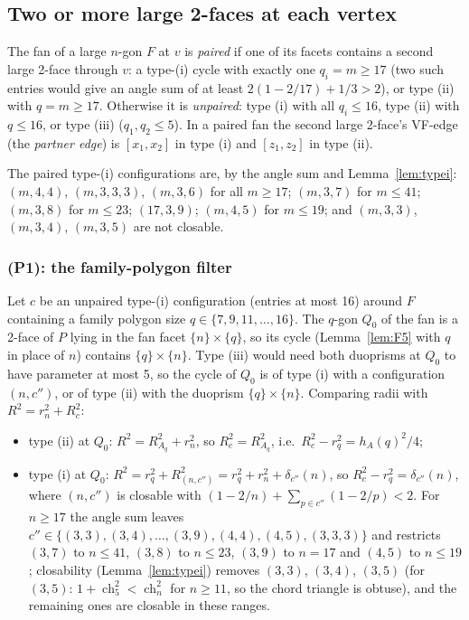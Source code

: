 \documentclass[11pt]{article}
\theoremstyle{definition}
\theoremstyle{remark}
\newcommand{\ch}{\operatorname{ch}}
\begin{document}
\subsection{Two or more large 2-faces at each vertex}\label{sec:s2}

The fan of a large $n$-gon $F$ at $v$ is \emph{paired} if one of its
facets contains a second large 2-face through $v$: a type-(i) cycle with
exactly one $q_i=m\ge17$ (two such entries would give an angle sum of at
least $2(1-2/17)+1/3>2$), or type (ii) with $q=m\ge17$. Otherwise it is
\emph{unpaired}: type (i) with all $q_i\le16$, type (ii) with $q\le16$, or
type (iii) ($q_1,q_2\le5$). In a paired fan the second large 2-face's
VF-edge (the \emph{partner edge}) is $[x_1,x_2]$ in type (i) and
$[z_1,z_2]$ in type (ii).

The paired type-(i) configurations are, by the angle sum and
Lemma~\ref{lem:typei}: $(m,4,4)$, $(m,3,3,3)$, $(m,3,6)$ for all $m\ge17$;
$(m,3,7)$ for $m\le41$; $(m,3,8)$ for $m\le23$; $(17,3,9)$; $(m,4,5)$ for
$m\le19$; and $(m,3,3)$, $(m,3,4)$, $(m,3,5)$ are not closable.

\subsubsection{(P1): the family-polygon filter}

Let $c$ be an unpaired type-(i) configuration (entries at most 16) around
$F$ containing a family polygon size $q\in\{7,9,11,\dots,16\}$. The $q$-gon
$Q_0$ of the fan is a 2-face of $P$ lying in the fan facet
$\{n\}\times\{q\}$, so its cycle (Lemma~\ref{lem:F5} with $q$ in place of $n$)
contains $\{q\}\times\{n\}$. Type (iii) would need both duoprisms at $Q_0$ to
have parameter at most 5, so the cycle of $Q_0$ is of type (i) with a
configuration $(n,c'')$, or of type (ii) with the duoprism
$\{q\}\times\{n\}$. Comparing radii with $R^2=r_n^2+R_c^2$:
\begin{itemize}[leftmargin=2em]
\item type (ii) at $Q_0$: $R^2=R_{A_q}^2+r_n^2$, so $R_c^2=R_{A_q}^2$, i.e.\
  $R_c^2-r_q^2=h_A(q)^2/4$;
\item type (i) at $Q_0$: $R^2=r_q^2+R_{(n,c'')}^2=r_q^2+r_n^2+\delta_{c''}(n)$,
  so $R_c^2-r_q^2=\delta_{c''}(n)$, where $(n,c'')$ is closable with
  $(1-2/n)+\sum_{p\in c''}(1-2/p)<2$. For $n\ge17$ the angle sum leaves
  $c''\in\{(3,3),(3,4),\dots,(3,9),(4,4),(4,5),(3,3,3)\}$ and restricts
  $(3,7)$ to $n\le41$, $(3,8)$ to $n\le23$, $(3,9)$ to $n=17$ and $(4,5)$ to
  $n\le19$; closability (Lemma~\ref{lem:typei}) removes $(3,3)$, $(3,4)$,
  $(3,5)$ (for $(3,5)$: $1+\ch_5^2<\ch_n^2$ for $n\ge11$, so the chord triangle
  is obtuse), and the remaining ones are closable in these ranges.
\end{itemize}
\end{document}
